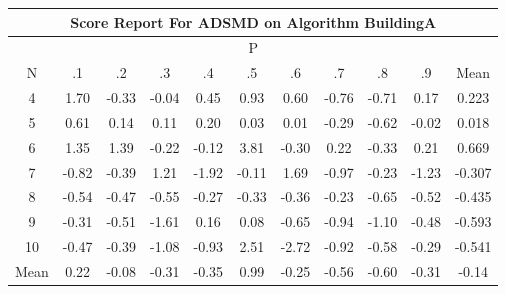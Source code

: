 \documentclass[11pt,a4paper]{report}
\begin{document}
\begin{longtable}{ | c || c | c | c | c | c | c | c | c | c || c |}
\hline
\multicolumn{11}{|c|}{ Score Report For ADSMD on Algorithm BuildingA} \\
\hline
\multicolumn{11}{|c|}{ P } \\
\hline
N & .1 & .2 & .3 & .4 & .5 & .6 & .7 & .8 & .9 & Mean\\
 \hline
 \hline
 \endhead
  4 &  \cellcolor[HTML]{D7D7FF} 1.70 &  \cellcolor[HTML]{FFF7F7} -0.33 &  \cellcolor[HTML]{FFFFFF} -0.04 &  \cellcolor[HTML]{F7F7FF} 0.45 &  \cellcolor[HTML]{E7E7FF} 0.93 &  \cellcolor[HTML]{EFEFFF} 0.60 &  \cellcolor[HTML]{FFEFEF} -0.76 &  \cellcolor[HTML]{FFEFEF} -0.71 &  \cellcolor[HTML]{F7F7FF} 0.17 & 0.223 \\
  5 &  \cellcolor[HTML]{EFEFFF} 0.61 &  \cellcolor[HTML]{FFFFFF} 0.14 &  \cellcolor[HTML]{FFFFFF} 0.11 &  \cellcolor[HTML]{F7F7FF} 0.20 &  \cellcolor[HTML]{FFFFFF} 0.03 &  \cellcolor[HTML]{FFFFFF} 0.01 &  \cellcolor[HTML]{FFF7F7} -0.29 &  \cellcolor[HTML]{FFEFEF} -0.62 &  \cellcolor[HTML]{FFFFFF} -0.02 & 0.018 \\
  6 &  \cellcolor[HTML]{DFDFFF} 1.35 &  \cellcolor[HTML]{DFDFFF} 1.39 &  \cellcolor[HTML]{FFF7F7} -0.22 &  \cellcolor[HTML]{FFFFFF} -0.12 &  \cellcolor[HTML]{9F9FFF} 3.81 &  \cellcolor[HTML]{FFF7F7} -0.30 &  \cellcolor[HTML]{F7F7FF} 0.22 &  \cellcolor[HTML]{FFF7F7} -0.33 &  \cellcolor[HTML]{F7F7FF} 0.21 & 0.669 \\
  7 &  \cellcolor[HTML]{FFE7E7} -0.82 &  \cellcolor[HTML]{FFF7F7} -0.39 &  \cellcolor[HTML]{DFDFFF} 1.21 &  \cellcolor[HTML]{FFCFCF} -1.92 &  \cellcolor[HTML]{FFFFFF} -0.11 &  \cellcolor[HTML]{D7D7FF} 1.69 &  \cellcolor[HTML]{FFE7E7} -0.97 &  \cellcolor[HTML]{FFF7F7} -0.23 &  \cellcolor[HTML]{FFDFDF} -1.23 & -0.307 \\
  8 &  \cellcolor[HTML]{FFEFEF} -0.54 &  \cellcolor[HTML]{FFF7F7} -0.47 &  \cellcolor[HTML]{FFEFEF} -0.55 &  \cellcolor[HTML]{FFF7F7} -0.27 &  \cellcolor[HTML]{FFF7F7} -0.33 &  \cellcolor[HTML]{FFF7F7} -0.36 &  \cellcolor[HTML]{FFF7F7} -0.23 &  \cellcolor[HTML]{FFEFEF} -0.65 &  \cellcolor[HTML]{FFEFEF} -0.52 & -0.435 \\
  9 &  \cellcolor[HTML]{FFF7F7} -0.31 &  \cellcolor[HTML]{FFEFEF} -0.51 &  \cellcolor[HTML]{FFD7D7} -1.61 &  \cellcolor[HTML]{F7F7FF} 0.16 &  \cellcolor[HTML]{FFFFFF} 0.08 &  \cellcolor[HTML]{FFEFEF} -0.65 &  \cellcolor[HTML]{FFE7E7} -0.94 &  \cellcolor[HTML]{FFE7E7} -1.10 &  \cellcolor[HTML]{FFF7F7} -0.48 & -0.593 \\
  10 &  \cellcolor[HTML]{FFF7F7} -0.47 &  \cellcolor[HTML]{FFF7F7} -0.39 &  \cellcolor[HTML]{FFE7E7} -1.08 &  \cellcolor[HTML]{FFE7E7} -0.93 &  \cellcolor[HTML]{BFBFFF} 2.51 &  \cellcolor[HTML]{FFB7B7} -2.72 &  \cellcolor[HTML]{FFE7E7} -0.92 &  \cellcolor[HTML]{FFEFEF} -0.58 &  \cellcolor[HTML]{FFF7F7} -0.29 & -0.541 \\
 \hline
 \hline
Mean &  \cellcolor[HTML]{F7F7FF} 0.22 &  \cellcolor[HTML]{FFFFFF} -0.08 &  \cellcolor[HTML]{FFF7F7} -0.31 &  \cellcolor[HTML]{FFF7F7} -0.35 &  \cellcolor[HTML]{E7E7FF} 0.99 &  \cellcolor[HTML]{FFF7F7} -0.25 &  \cellcolor[HTML]{FFEFEF} -0.56 &  \cellcolor[HTML]{FFEFEF} -0.60 &  \cellcolor[HTML]{FFF7F7} -0.31 &  \cellcolor[HTML]{FFFFFF} -0.14
\end{longtable}
\end{document}
